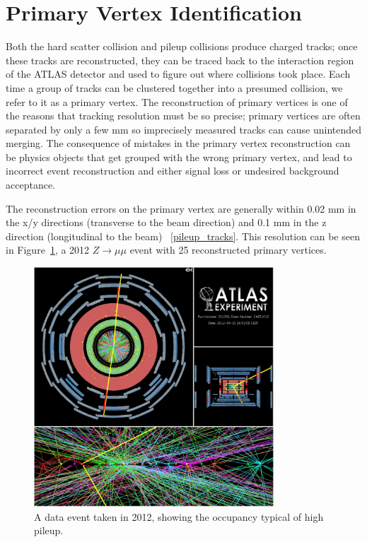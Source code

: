 \section{Primary Vertex Identification}
\label{sec:pv}
Both the hard scatter collision and pileup collisions produce charged tracks; once these tracks are reconstructed, they can be traced back to the interaction region of the ATLAS detector and used to figure out where collisions took place.  Each time a group of tracks can be clustered together into a presumed collision, we refer to it as a primary vertex.  The reconstruction of primary vertices is one of the reasons that tracking resolution must be so precise; primary vertices are often separated by only a few mm so imprecisely measured tracks can cause unintended merging.  The consequence of mistakes in the primary vertex reconstruction can be physics objects that get grouped with the wrong primary vertex, and lead to incorrect event reconstruction and either signal loss or undesired background acceptance.

The reconstruction errors on the primary vertex are generally within 0.02 mm in the x/y directions 
(transverse to the beam direction) and 0.1 mm in the z direction (longitudinal to the  
beam) ~\ref{pileup_tracks}.   This resolution can be seen in Figure~\ref{fig:pileup_pv}, a 2012 
$Z\rightarrow\mu\mu$ event with 25 reconstructed primary vertices.


\begin{figure}
	\includegraphics[width=0.8\textwidth]{ReconstructionPerformance/images/2012_highPileup.pdf}
	\caption{A data event taken in 2012, showing the occupancy typical of high pileup. 	\label{fig:pileup_pv}  }
\end{figure}


